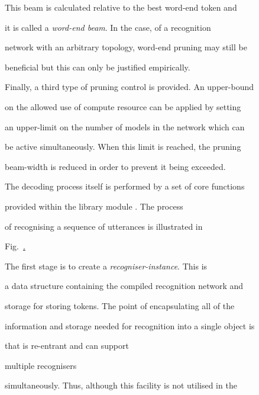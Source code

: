 This beam is calculated relative to the best word-end token and


it is called a \textit{word-end beam}.  In the case, of a recognition


network with an arbitrary topology, word-end pruning may still be


beneficial but this can only be justified empirically.





Finally, a third type of pruning control is provided.  An upper-bound


on the allowed use of compute resource can be applied by setting


an upper-limit on the number of models in the network which can


be active simultaneously.  When this limit is reached, the pruning


beam-width is reduced in order to prevent it being exceeded.













The decoding process itself is performed by a set of core functions 


provided within the library module .  The process


of recognising a sequence of utterances is illustrated in 


Fig.~\href{f:decflow}.







The first stage is to create a \textit{recogniser-instance}.  This is


a data structure containing the compiled recognition network and


storage for storing tokens.  The point of encapsulating all of the


information and storage needed for recognition into a single object is


that  is re-entrant and can support 


multiple recognisers


simultaneously.  Thus, although this facility is not utilised in the


